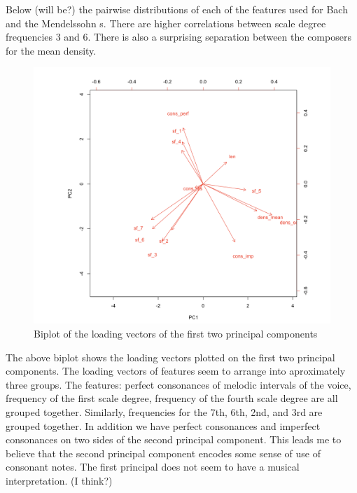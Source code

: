 \documentclass[12pt,twoside]{reedthesis}
\theoremstyle{definition}
\theoremstyle{definition}
\theoremstyle{definition}
\theoremstyle{remark}
\begin{document}
Below (will be?) the pairwise distributions of each of the features used
for Bach and the Mendelssohn s. There are higher correlations between
scale degree frequencies 3 and 6. There is also a surprising separation
between the composers for the mean density.
\begin{figure}[h]
\centering
\includegraphics[scale = .3]{images/n_label_bi_bm.png}
\caption{Biplot of the loading vectors of the first two principal components}
\label{subd}
\end{figure}
The above biplot shows the loading vectors plotted on the first two
principal components. The loading vectors of features seem to arrange
into aproximately three groups. The features: perfect consonances of
melodic intervals of the voice, frequency of the first scale degree,
frequency of the fourth scale degree are all grouped together.
Similarly, frequencies for the 7th, 6th, 2nd, and 3rd are grouped
together. In addition we have perfect consonances and imperfect
consonances on two sides of the second principal component. This leads
me to believe that the second principal component encodes some sense of
use of consonant notes. The first principal does not seem to have a
musical interpretation. (I think?)
\end{document}
